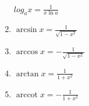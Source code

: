 \begin{center}
\begin{small}
\begin{enumerate}
\begin{math}
				      log_a x = \frac{1}{x \ln a}
			      \end{math}
			\item \begin{math}
				      \arcsin x = \frac{1}{\sqrt {1 - x^2}}
			      \end{math}
			\item \begin{math}
				      \arccos x = - \frac{1}{\sqrt{1 - x^2}}
			      \end{math}
			\item \begin{math}
				      \arctan x = \frac{1}{1 + x^2}
			      \end{math}
			\item \begin{math}
				      \operatorname{arccot}x = -\frac{1}{1 + x^2}
			      \end{math}
		\end{enumerate}
	\end{small}
\end{center}

